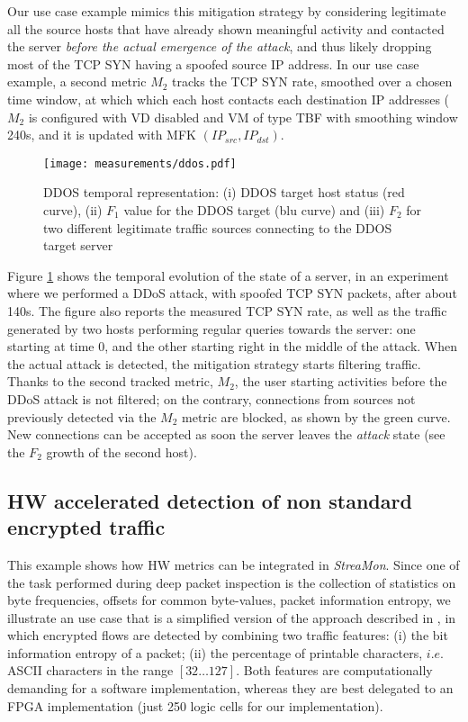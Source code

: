 \documentclass[conference,letterpaper]{sig-alternate-10pt}
\begin{document}
Our use case example mimics this mitigation strategy by considering legitimate all the source hosts that have already shown meaningful activity and contacted the server {\em before the actual emergence of the attack}, and thus likely dropping most of the TCP SYN having a spoofed source IP address. In our use case example, a second metric $M_2$ tracks the TCP SYN rate, smoothed over a chosen time window, at which which each host contacts each destination IP addresses ($M_2$ is configured with VD disabled and VM of type TBF with smoothing window 240s, and it is updated with MFK  $(IP_{src}, IP_{dst})$.

\begin{figure}[t]
	\centering
	\texttt{[image: measurements/ddos.pdf]}
	\caption{DDOS temporal representation: (i) DDOS target host status (red curve), (ii) $F_1$ value for the DDOS target (blu curve) and (iii) $F_2$ for two different legitimate traffic sources connecting to the DDOS target server}
	\vspace*{-.5cm}
	\label{fig:DDOS}
\end{figure}

Figure \ref{fig:DDOS} shows the temporal evolution of the state of a server, in an experiment where we performed a DDoS attack, with spoofed TCP SYN packets, after about 140s. The figure also reports the measured TCP SYN rate, as well as the traffic generated by two hosts performing regular queries towards the server: one starting at time 0, and the other starting right in the middle of the attack.
When the actual attack is detected, the mitigation strategy starts filtering traffic. Thanks to the second tracked metric, $M_2$, the user starting activities before the DDoS attack is not filtered; on the contrary, connections from sources not previously detected via the $M_2$ metric are blocked, as shown by the green curve. New connections can be accepted as soon the server leaves the \emph{attack} state (see the $F_2$ growth of the second host).

\subsection{HW accelerated detection of non standard encrypted traffic}
\label{s:entropy}
This example shows how HW metrics can be integrated in {\em StreaMon}. Since one of the task performed during deep packet inspection is the collection of statistics on byte frequencies, offsets for common byte-values, packet information entropy, we illustrate an use case that is a simplified version of the approach described in \cite{entropy}, in which encrypted flows are detected by combining two traffic features: (i) the bit information entropy of a packet; (ii) the percentage of printable characters, $i.e.$ ASCII characters in the range $[32 \ldots 127]$. Both features are computationally demanding for a software implementation, whereas they are best delegated to an FPGA implementation (just 250 logic cells for our implementation).
\end{document}
